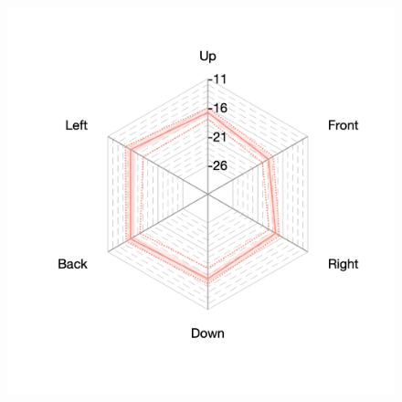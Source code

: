 \documentclass[11pt,a4j]{jreport}
\begin{document}
\begin{figure}[H]
\begin{minipage}[b]{.33\textwidth}
    \label{fig:ホールBにおけるSTEarly}
  \end{minipage}%
  \begin{minipage}[b]{.33\textwidth}
    \centering
    \includegraphics[width=1\linewidth]{images/realHallDirSt/early_hall_c_allpoints.png}
    \label{fig:ホールCにおけるSTEarly}
  \end{minipage}


\end{figure}
\end{document}
